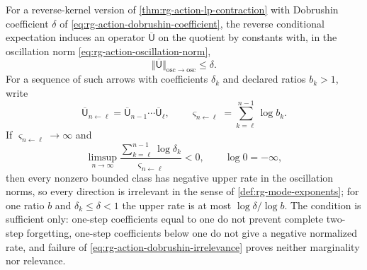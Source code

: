 For a reverse-kernel version of \cref{thm:rg-action-lp-contraction} with
Dobrushin coefficient \(\delta\) of \eqref{eq:rg-action-dobrushin-coefficient},
the reverse conditional expectation induces an operator \(\overline{\mathsf U}\) on the
quotient by constants with, in the oscillation norm
\eqref{eq:rg-action-oscillation-norm},
\begin{equation}
\Vert\overline{\mathsf U}\Vert_{\mathrm{osc}\to\mathrm{osc}}\leq\delta.
\label{eq:rg-action-dobrushin-contraction}
\end{equation}
For a sequence of such arrows with coefficients \(\delta_k\) and declared
ratios \(b_k>1\), write
\begin{equation}
\overline{\mathsf U}_{n\leftarrow\ell}=\overline{\mathsf U}_{n-1}\cdots\overline{\mathsf U}_\ell,
\qquad
\varsigma_{n\leftarrow\ell}=\sum_{k=\ell}^{n-1}\log b_k.
\label{eq:rg-action-cocycle-scale}
\end{equation}
If \(\varsigma_{n\leftarrow\ell}\to\infty\) and
\begin{equation}
\limsup_{n\to\infty}
\frac{\sum_{k=\ell}^{n-1}\log\delta_k}{\varsigma_{n\leftarrow\ell}}<0,
\qquad\log0=-\infty,
\label{eq:rg-action-dobrushin-irrelevance}
\end{equation}
then every nonzero bounded class has negative upper rate in the oscillation
norms, so every direction is irrelevant in the sense of
\cref{def:rg-mode-exponents}; for one ratio \(b\) and \(\delta_k\leq\delta<1\)
the upper rate is at most \(\log\delta/\log b\). The condition is sufficient
only: one-step coefficients equal to one do not prevent complete two-step
forgetting, one-step coefficients below one do not give a negative normalized
rate, and failure of \eqref{eq:rg-action-dobrushin-irrelevance} proves neither
marginality nor relevance. 

